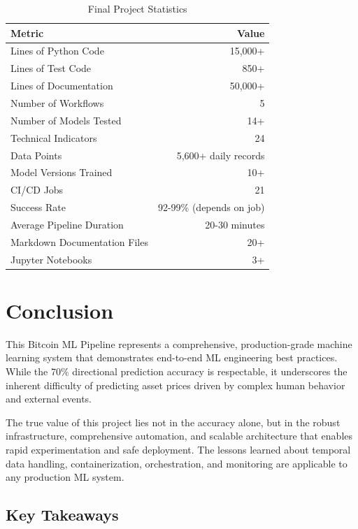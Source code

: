 \begin{table}[H]
\centering
\caption{Final Project Statistics}
\begin{tabularx}{\textwidth}{lr}
\toprule
\textbf{Metric} & \textbf{Value} \\
\midrule
Lines of Python Code & 15,000+ \\
Lines of Test Code & 850+ \\
Lines of Documentation & 50,000+ \\
Number of Workflows & 5 \\
Number of Models Tested & 14+ \\
Technical Indicators & 24 \\
Data Points & 5,600+ daily records \\
Model Versions Trained & 10+ \\
CI/CD Jobs & 21 \\
Success Rate & 92-99\% (depends on job) \\
Average Pipeline Duration & 20-30 minutes \\
Markdown Documentation Files & 20+ \\
Jupyter Notebooks & 3+ \\
\bottomrule
\end{tabularx}
\end{table}

\section{Conclusion}

This Bitcoin ML Pipeline represents a comprehensive, production-grade machine learning system that demonstrates end-to-end ML engineering best practices. While the 70\% directional prediction accuracy is respectable, it underscores the inherent difficulty of predicting asset prices driven by complex human behavior and external events.

The true value of this project lies not in the accuracy alone, but in the robust infrastructure, comprehensive automation, and scalable architecture that enables rapid experimentation and safe deployment. The lessons learned about temporal data handling, containerization, orchestration, and monitoring are applicable to any production ML system.

\subsection{Key Takeaways}

